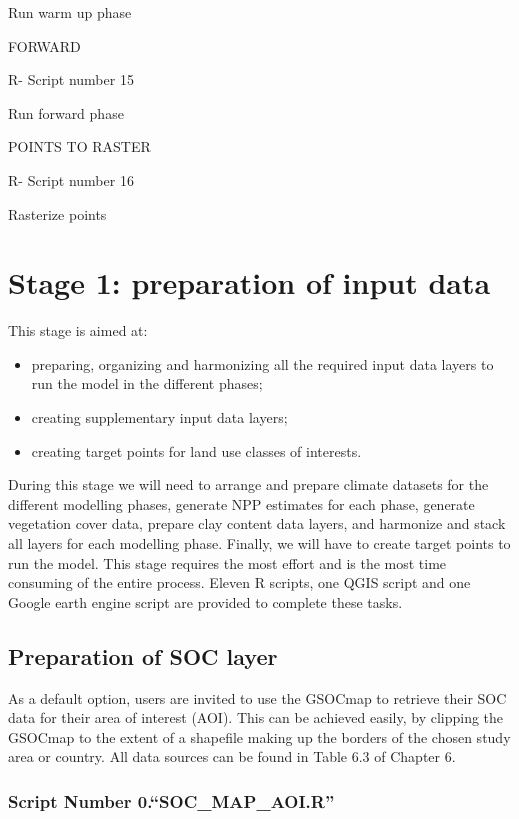 \documentclass[
  10pt,
  b5paper,
]{book}
\providecommand{\tightlist}{%
  \setlength{\itemsep}{0pt}\setlength{\parskip}{0pt}}
\begin{document}
Run warm up phase

FORWARD

R- Script number 15

Run forward phase

POINTS TO RASTER

R- Script number 16

Rasterize points

\hypertarget{stage-1-preparation-of-input-data}{%
\chapter{\textbar{} Stage 1: preparation of input data}\label{stage-1-preparation-of-input-data}}

This stage is aimed at:

\begin{itemize}
\tightlist
\item
  preparing, organizing and harmonizing all the required input data layers to run the model in the different phases;
\item
  creating supplementary input data layers;
\item
  creating target points for land use classes of interests.
\end{itemize}

During this stage we will need to arrange and prepare climate datasets for the different modelling phases, generate NPP estimates for each phase, generate vegetation cover data, prepare clay content data layers, and harmonize and stack all layers for each modelling phase. Finally, we will have to create target points to run the model. This stage requires the most effort and is the most time consuming of the entire process. Eleven R scripts, one QGIS script and one Google earth engine script are provided to complete these tasks.

\hypertarget{preparation-of-soc-layer}{%
\section{Preparation of SOC layer}\label{preparation-of-soc-layer}}

As a default option, users are invited to use the GSOCmap to retrieve their SOC data for their area of interest (AOI). This can be achieved easily, by clipping the GSOCmap to the extent of a shapefile making up the borders of the chosen study area or country. All data sources can be found in Table 6.3 of Chapter 6.

\hypertarget{script-number-0.soc_map_aoi.r}{%
\subsection{Script Number 0.``SOC\_MAP\_AOI.R''}\label{script-number-0.soc_map_aoi.r}}
\end{document}
